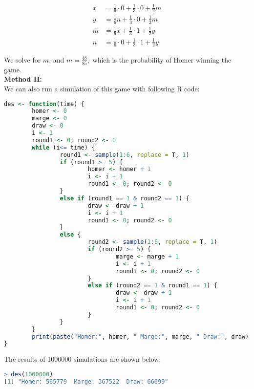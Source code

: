 \documentclass[a4paper, 11pt, twoside]{article}
\begin{document}
\[
\begin{split}
x &= \frac{1}{6}\cdot 0 + \frac{1}{3}\cdot 0 +\frac{1}{2}m\\
y &= \frac{1}{6}n + \frac{1}{3}\cdot 0 + \frac{1}{2}m\\
m &= \frac{1}{6}x + \frac{1}{3}\cdot 1 + \frac{1}{2}y\\
n &= \frac{1}{6}\cdot 0 + \frac{1}{3}\cdot 1 + \frac{1}{2}y	
\end{split}
\]

We solve for $m$, and $m=\frac{48}{85},$ which is the probability of Homer winning the game.\\

\textbf{Method II:}\\

We can also run a simulation of this game with following R code:\\

\begin{lstlisting}[language=R]
des <- function(time) {
        homer <- 0
        marge <- 0
        draw <- 0
        i <- 1
        round1 <- 0; round2 <- 0
        while (i<= time) {
                round1 <- sample(1:6, replace = T, 1)
                if (round1 >= 5) {
                        homer <- homer + 1
                        i <- i + 1
                        round1 <- 0; round2 <- 0
                }
                else if (round1 == 1 & round2 == 1) {
                        draw <- draw + 1
                        i <- i + 1
                        round1 <- 0; round2 <- 0
                }
                else {
                        round2 <- sample(1:6, replace = T, 1)
                        if (round2 >= 5) {
                                marge <- marge + 1
                                i <- i + 1
                                round1 <- 0; round2 <- 0
                        }
                        else if (round2 == 1 & round1 == 1) {
                                draw <- draw + 1
                                i <- i + 1
                                round1 <- 0; round2 <- 0
                        }
                }
        }
        print(paste("Homer:", homer, " Marge:", marge, " Draw:", draw))
}
\end{lstlisting}

The results of 1000000 simulations are shown below:

\begin{lstlisting}[language=R]
> des(1000000)
[1] "Homer: 565779  Marge: 367522  Draw: 66699"\end{lstlisting}
\end{document}
